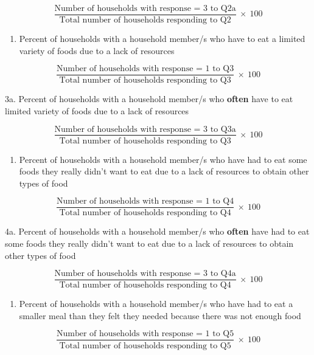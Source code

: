 \documentclass[12pt,]{book}
\providecommand{\tightlist}{%
  \setlength{\itemsep}{0pt}\setlength{\parskip}{0pt}}
\theoremstyle{definition}
\theoremstyle{definition}
\theoremstyle{definition}
\theoremstyle{remark}
\begin{document}
\[ \frac{\text{Number of households with response = 3 to Q2a}}{\text{Total number of households responding to Q2}} ~ \times ~ 100 \]

\begin{enumerate}
\def\labelenumi{\arabic{enumi}.}
\setcounter{enumi}{2}
\tightlist
\item
  Percent of households with a household member/s who have to eat a
  limited variety of foods due to a lack of resources
\end{enumerate}

\[ \frac{\text{Number of households with response = 1 to Q3}}{\text{Total number of households responding to Q3}} ~ \times ~ 100 \]

3a. Percent of households with a household member/s who \textbf{often}
have to eat limited variety of foods due to a lack of resources

\[ \frac{\text{Number of households with response = 3 to Q3a}}{\text{Total number of households responding to Q3}} ~ \times ~ 100 \]

\begin{enumerate}
\def\labelenumi{\arabic{enumi}.}
\setcounter{enumi}{3}
\tightlist
\item
  Percent of households with a household member/s who have had to eat
  some foods they really didn't want to eat due to a lack of resources
  to obtain other types of food
\end{enumerate}

\[ \frac{\text{Number of households with response = 1 to Q4}}{\text{Total number of households responding to Q4}} ~ \times ~ 100 \]

4a. Percent of households with a household member/s who \textbf{often}
have had to eat some foods they really didn't want to eat due to a lack
of resources to obtain other types of food

\[ \frac{\text{Number of households with response = 3 to Q4a}}{\text{Total number of households responding to Q4}} ~ \times ~ 100 \]

\begin{enumerate}
\def\labelenumi{\arabic{enumi}.}
\setcounter{enumi}{4}
\tightlist
\item
  Percent of households with a household member/s who have had to eat a
  smaller meal than they felt they needed because there was not enough
  food
\end{enumerate}

\[ \frac{\text{Number of households with response = 1 to Q5}}{\text{Total number of households responding to Q5}} ~ \times ~ 100 \]
\end{document}
